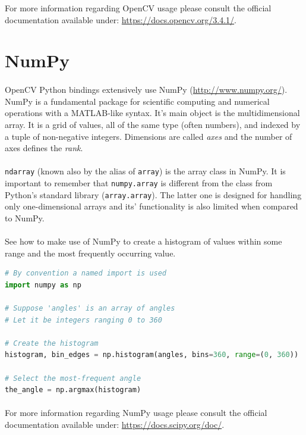 For more information regarding OpenCV usage please consult the official documentation available under: \url{https://docs.opencv.org/3.4.1/}.

\section{NumPy}
\paragraph{}
OpenCV Python bindings extensively use NumPy (\url{http://www.numpy.org/}). NumPy is a fundamental package for scientific computing and numerical operations with a MATLAB-like syntax. It's main object is the multidimensional array. It is a grid of values, all of the same type (often numbers), and indexed by a tuple of non-negative integers. Dimensions are called \textit{axes} and the number of axes defines the \textit{rank}.
\paragraph{}
\texttt{ndarray} (known also by the alias of \texttt{array}) is the array class in NumPy. It is important to remember that \texttt{numpy.array} is different from the class from Python's standard library (\texttt{array.array}). The latter one is designed for handling only one-dimensional arrays and its' functionality is also limited when compared to NumPy.

\paragraph{}
See how to make use of NumPy to create a histogram of values within some range and the most frequently occurring value.

\begin{lstlisting}[language=Python, caption=Example usage of NumPy, basicstyle={\ttfamily}]
# By convention a named import is used
import numpy as np

# Suppose 'angles' is an array of angles
# Let it be integers ranging 0 to 360

# Create the histogram
histogram, bin_edges = np.histogram(angles, bins=360, range=(0, 360))

# Select the most-frequent angle
the_angle = np.argmax(histogram)
\end{lstlisting}

\paragraph{}
For more information regarding NumPy usage please consult the official documentation available under: \url{https://docs.scipy.org/doc/}.

